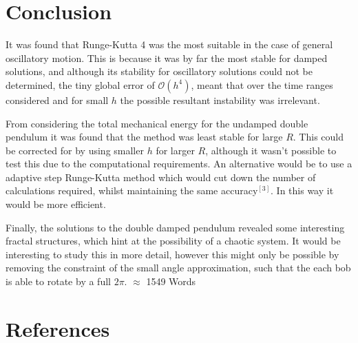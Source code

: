 \documentclass[10pt,a4paper]{article}
\begin{document}
\section{Conclusion}
It was found that Runge-Kutta 4 was the most suitable in the case of general oscillatory motion. This is because it was by far the most stable for damped solutions, and although its stability for oscillatory solutions could not be determined, the tiny global error of $\mathcal{O}(h^4)$, meant that over the time ranges considered and for small $h$ the possible resultant instability was irrelevant. 

From considering the total mechanical energy for the undamped double pendulum it was found that the method was least stable for large $R$. This could be corrected for by using smaller $h$ for larger $R$, although it wasn't possible to test this due to the computational requirements. An alternative would be to use a adaptive step Runge-Kutta method which would cut down the number of calculations required, whilst maintaining the same accuracy$^{[3]}$. In this way it would be more efficient.

Finally, the solutions to the double damped pendulum revealed some interesting fractal structures, which hint at the possibility of a chaotic system. It would be interesting to study this in more detail, however this might only be possible by removing the constraint of the small angle approximation, such that the each bob is able to rotate by a full $2\pi$.
\newline
\newline
$\approx$ 1549 Words

\section{References}


\\
\\
\\
\\
\\
\\
\end{document}
